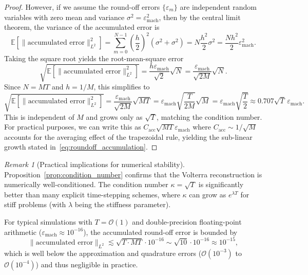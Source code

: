 \documentclass[11pt,reqno]{amsart}
\theoremstyle{plain}
\theoremstyle{definition}
\theoremstyle{remark}
\newtheorem{remark}[theorem]{Remark}
\begin{document}
\begin{proof}
\noindent However, if we assume the round-off errors $\{\varepsilon_m\}$ are independent random variables with zero mean and variance $\sigma^2 = \varepsilon_{\mathrm{mach}}^2$, then by the central limit theorem, the variance of the accumulated error is
\begin{equation}
    \mathbb{E}\left[ \|\text{accumulated error}\|_{L^2}^2 \right] = \sum_{m=0}^{N-1} \left( \frac{h}{2} \right)^2 \left( \sigma^2 + \sigma^2 \right) = N \frac{h^2}{2} \sigma^2 = \frac{Nh^2}{2} \varepsilon_{\mathrm{mach}}^2.
\end{equation}
Taking the square root yields the root-mean-square error
\begin{equation}
    \sqrt{\mathbb{E}\left[ \|\text{accumulated error}\|_{L^2}^2 \right]} = \frac{h\varepsilon_{\mathrm{mach}}}{\sqrt{2}} \sqrt{N} = \frac{\varepsilon_{\mathrm{mach}}}{\sqrt{2M}} \sqrt{N}.
\end{equation}
Since $N = MT$ and $h = 1/M$, this simplifies to
\begin{equation}
    \sqrt{\mathbb{E}\left[ \|\text{accumulated error}\|_{L^2}^2 \right]} = \frac{\varepsilon_{\mathrm{mach}}}{\sqrt{2M}} \sqrt{MT} = \varepsilon_{\mathrm{mach}} \sqrt{\frac{T}{2M}} \sqrt{M} = \varepsilon_{\mathrm{mach}} \sqrt{\frac{T}{2}} \approx 0.707 \sqrt{T} \, \varepsilon_{\mathrm{mach}}.
\end{equation}
This is independent of $M$ and grows only as $\sqrt{T}$, matching the condition number. For practical purposes, we can write this as $C_{\mathrm{acc}} \sqrt{MT} \varepsilon_{\mathrm{mach}}$ where $C_{\mathrm{acc}} \sim 1/\sqrt{M}$ accounts for the averaging effect of the trapezoidal rule, yielding the sub-linear growth stated in~\eqref{eq:roundoff_accumulation}.
\end{proof}

\begin{remark}[Practical implications for numerical stability]
Proposition~\ref{prop:condition_number} confirms that the Volterra reconstruction is numerically well-conditioned. The condition number $\kappa = \sqrt{T}$ is significantly better than many explicit time-stepping schemes, where $\kappa$ can grow as $e^{\lambda T}$ for stiff problems (with $\lambda$ being the stiffness parameter).

\noindent For typical simulations with $T = \mathcal{O}(1)$ and double-precision floating-point arithmetic ($\varepsilon_{\mathrm{mach}} \approx 10^{-16}$), the accumulated round-off error is bounded by
\begin{equation}
    \|\text{accumulated error}\|_{L^2} \lesssim \sqrt{T \cdot MT} \cdot 10^{-16} \sim \sqrt{10} \cdot 10^{-16} \approx 10^{-15},
\end{equation}
which is well below the approximation and quadrature errors ($\mathcal{O}(10^{-3})$ to $\mathcal{O}(10^{-4})$) and thus negligible in practice.
\end{remark}
\end{document}
